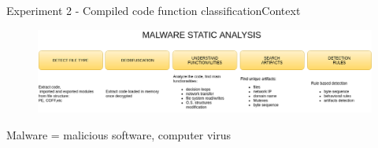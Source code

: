 \documentclass[xcolor=table]{beamer}
\begin{document}
\begin{frame}{Experiment 2 - Compiled code function classification}{Context}



\begin{figure}
    \includegraphics[scale=0.32]{./img/malware_static_analysis.png}
\end{figure}


Malware = malicious software, computer virus






\end{frame}
\end{document}
